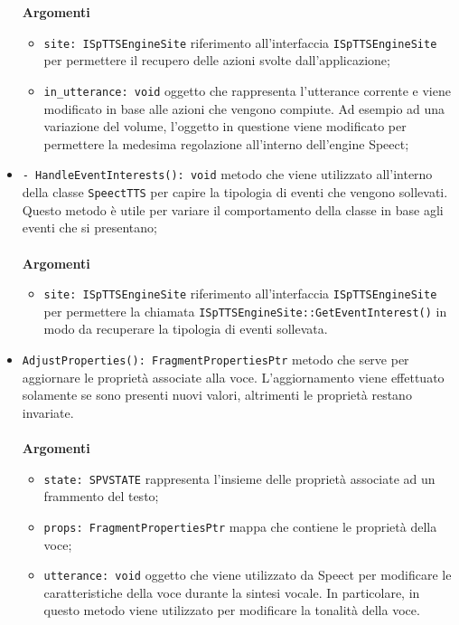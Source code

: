 \begin{itemize}
	\\\\
	\textbf{Argomenti}
	\begin{itemize}
		\item \texttt{site: ISpTTSEngineSite} riferimento all'interfaccia \texttt{ISpTTSEngineSite} per permettere il recupero delle azioni svolte dall'applicazione;
		\item \texttt{in\_utterance: void} oggetto che rappresenta l'utterance corrente e  viene modificato in base alle azioni che vengono compiute. Ad esempio ad una variazione del volume, l'oggetto in questione viene modificato per permettere la medesima regolazione all'interno dell'engine Speect;
	\end{itemize}
	\item \texttt{- HandleEventInterests(): void} metodo che viene utilizzato all'interno della classe \texttt{SpeectTTS} per capire la tipologia di eventi che vengono sollevati. Questo metodo è utile per variare il comportamento della classe in base agli eventi che si presentano;\\\\
	\textbf{Argomenti}
	\begin{itemize}
		\item \texttt{site: ISpTTSEngineSite} riferimento all'interfaccia \texttt{ISpTTSEngineSite} per permettere la chiamata \texttt{ISpTTSEngineSite::GetEventInterest()} in modo da recuperare la tipologia di eventi sollevata.
	\end{itemize}
	\item \texttt{AdjustProperties(): FragmentPropertiesPtr} metodo che serve per aggiornare le proprietà associate alla voce. L'aggiornamento viene effettuato solamente se sono presenti nuovi valori, altrimenti le proprietà restano invariate.
	\\\\
	\textbf{Argomenti}
	\begin{itemize}
		\item \texttt{state: SPVSTATE} rappresenta l'insieme delle proprietà associate ad un frammento del testo;
		\item \texttt{props: FragmentPropertiesPtr} mappa che contiene le proprietà della voce;
		\item \texttt{utterance: void} oggetto che viene utilizzato da Speect per modificare le caratteristiche della voce durante la sintesi vocale. In particolare, in questo metodo viene utilizzato per modificare la tonalità della voce.
	\end{itemize} 		
\end{itemize}
